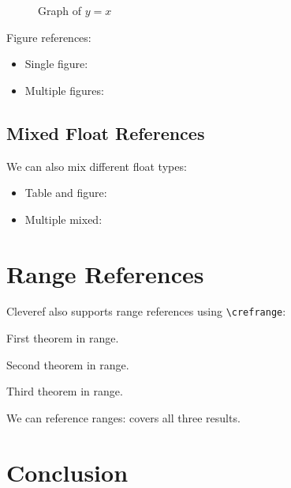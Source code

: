 \documentclass[11pt]{article}
\begin{document}
\begin{figure}[htbp]
\centering
{}
\caption{Graph of $y = x$}
\label{fig:linear}
\end{figure}

Figure references:
\begin{itemize}
\item Single figure: 
\item Multiple figures: 
\end{itemize}

\subsection{Mixed Float References}

We can also mix different float types:
\begin{itemize}
\item Table and figure: 
\item Multiple mixed: 
\end{itemize}

\section{Range References}

Cleveref also supports range references using \texttt{\textbackslash crefrange}:

\begin{theorem}\label{thm:first-range}
First theorem in range.
\end{theorem}

\begin{theorem}\label{thm:second-range}
Second theorem in range.
\end{theorem}

\begin{theorem}\label{thm:third-range}
Third theorem in range.
\end{theorem}

We can reference ranges:  covers all three results.

\section{Conclusion}
\end{document}
